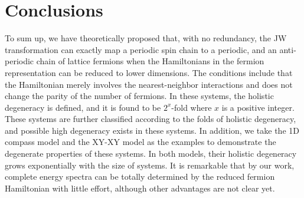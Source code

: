 \documentclass[twocolumn,floats,superscriptaddress]{revtex4}
\begin{document}
\section{Conclusions}
To sum up, we have theoretically proposed that, {with no redundancy,} the JW transformation can exactly map a periodic spin chain to a periodic, and an anti-periodic {chain} of lattice fermions when the Hamiltonians in the fermion representation can be reduced to lower dimensions. The conditions include that the Hamiltonian merely involves the nearest-neighbor interactions and does not change the parity of the number of fermions. In these systems, the holistic degeneracy is defined, and it is found to be {$2^x$-fold where $x$ is a positive integer}. These systems are further classified according to the folds of holistic degeneracy, and possible high degeneracy exists in these systems. In addition, we take the 1D compass model {and the XY-XY model} as the examples to demonstrate the degenerate properties of these systems. {In both models, their holistic degeneracy grows exponentially with the size of systems.} It is {remarkable that by our work, complete energy spectra can be totally determined by the reduced fermion Hamiltonian with little effort,} although other advantages are not clear yet.


\vspace{6pt}



\end{document}
